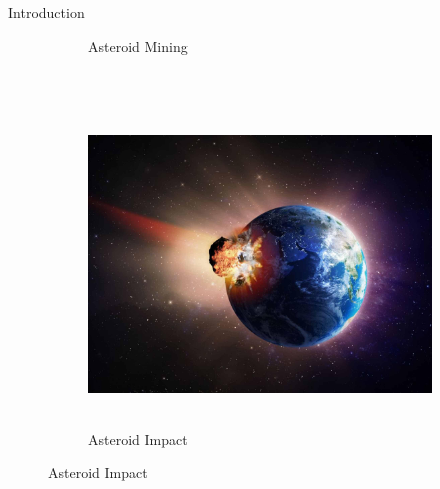 \documentclass[final, usenames, dvipsnames]{beamer}
\newlength{\onecolwidth}
\begin{document}
\begin{frame}[t]
\begin{columns}[T]
\begin{column}{\onecolwidth}
\begin{block}{Introduction}
\begin{figure}
\begin{subfigure}[b]{0.4\columnwidth}
	        \caption*{Asteroid Mining}%
        \end{subfigure}~\hfill 
        \begin{subfigure}[b]{0.4\columnwidth}%
            \includegraphics[height=8.5cm]{figures/asteroid-alamy.jpg}%
            \caption*{Asteroid Impact}%
        \end{subfigure}%
        \hfill%
	\end{figure}
\end{block} %


\end{column}
\end{columns}
\end{frame}
\end{document}
